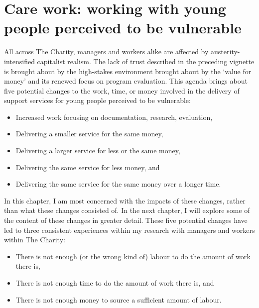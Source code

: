 \section{Care work: working with young people perceived to be vulnerable}
All across The Charity, managers and workers alike are affected by austerity-intensified capitalist realism. The lack of trust described in the preceding vignette is brought about by the high-stakes environment brought about by the ‘value for money’ and its renewed focus on program evaluation. This agenda brings about five potential changes to the work, time, or money involved in the delivery of support services for young people perceived to be vulnerable:
\begin{itemize}
\item Increased work focusing on documentation, research, evaluation,
\item Delivering a smaller service for the same money,
\item Delivering a larger service for less or the same money,
\item Delivering the same service for less money, and
\item Delivering the same service for the same money over a longer time.
\end{itemize}
In this chapter, I am most concerned with the impacts of these changes, rather than what these changes consisted of. In the next chapter, I will explore some of the content of these changes in greater detail. These five potential changes have led to three consistent experiences within my research with managers and workers within The Charity: 
\begin{itemize}
\item There is not enough (or the wrong kind of) labour to do the amount of work there is,
\item There is not enough time to do the amount of work there is, and
\item There is not enough money to source a sufficient amount of labour. 
\end{itemize}
